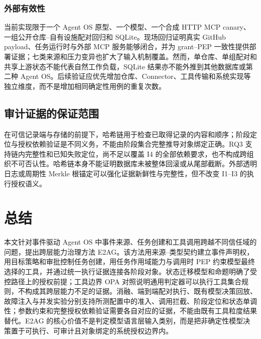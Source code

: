 \subsubsection{外部有效性}

当前实现限于一个 Agent OS 原型、一个模型、一个合成 HTTP MCP canary、一组公开仓库--自有设施配对回归和 SQLite。现场回归证明真实 GitHub payload、任务运行时与外部 MCP 服务能够闭合，并为 grant--PEP 一致性提供部署证据；七类来源和压力变异也扩大了输入机制覆盖。然而，单仓库、单组配对和共享上游状态不能代表自然工作负载，SQLite 结果亦不能外推到其他数据库或第二种 Agent OS。后续验证应优先增加仓库、Connector、工具传输和系统实现等独立维度，而不是增加相同确定性用例的重复次数。

\subsection{审计证据的保证范围}

在可信记录端与存储的前提下，哈希链用于检查已取得记录的内容和顺序；阶段定位与授权依赖验证是不同义务，不能由阶段集合完整推导对象绑定正确。RQ3 支持链内完整性和已知失败定位，尚不足以覆盖 I4 的全部依赖要求，也不构成跨组织不可否认性。哈希链本身不能证明数据库未被整体回滚或从尾部截断。外部透明日志或周期性 Merkle 根锚定可以强化证据新鲜性与完整性，但不改变 I1--I3 的执行授权语义。

\section{总结}\label{sec:conclusion-v11}

本文针对事件驱动 Agent OS 中事件来源、任务创建和工具调用跨越不同信任域的问题，提出跨层能力治理方法 E2AG。该方法用来源--类型契约建立事件声明权，用目标策略和审批控制任务创建，用任务作用域能力与调用时 PEP 约束模型最终选择的工具，并通过统一执行证据连接各阶段对象。状态迁移模型和命题明确了受控路径上的授权前提；工具边界 OPA 对照说明通用判定器可以执行工具集合规则，不构成其跨层能力不足的证据。消融、端到端配对执行、既有模型决策回放、故障注入与并发实验分别支持所测配置中的准入、调用拦截、阶段定位和状态单调性；参数约束和完整授权依赖验证需要各自对应的证据，不能由既有工具粒度结果替代。E2AG 的核心价值不是判定模型语言层输入类别，而是把非确定性模型决策置于可执行、可审计且对象绑定的系统授权边界内。

